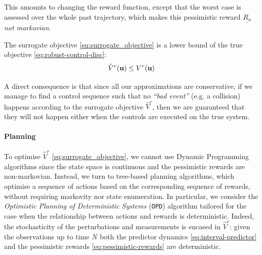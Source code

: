 \documentclass{article}
\begin{document}
This amounts to changing the reward function, except that the worst case is assessed over the whole past trajectory, which makes this pessimistic reward $\underline{R_n}$ \emph{not markovian}.

\begin{proposition}
\label{prop:lower-bound}
The surrogate objective  \eqref{eq:surrogate_objective} is a lower bound of the true objective  \eqref{eq:robust-control-disc}: 
\begin{equation*}
\hat{V}^r(\mathbf{u}) \leq V^r(\mathbf{u})
\end{equation*}
\end{proposition}
A direct consequence is that since all our approximations are conservative, if we manage to find a control sequence such that no \textit{``bad event''} (e.g. a collision) happens according to the surrogate objective $\hat{V}^r$, then we are guaranteed that they will not happen either when the controls are executed on the true system. 

\paragraph{Planning}
To optimise $\hat{V}^r$ \eqref{eq:surrogate_objective}, we cannot use Dynamic Programming algorithms since the state space is continuous and the pessimistic rewards are non-markovian. Instead, we turn to tree-based planning algorithms, which optimise a sequence of actions based on the corresponding sequence of rewards, without requiring markovity nor state enumeration. In particular, we consider the \emph{Optimistic Planning of Deterministic Systems} (\texttt{OPD}) algorithm \citep{Hren2008} tailored for the case when the relationship between actions and rewards is deterministic. Indeed, the stochasticity of the perturbations and measurements is encased in $\hat{V}^r$: given the observations up to time $N$ both the predictor dynamics \eqref{eq:interval-predictor} and the pessimistic rewards \eqref{eq:pessimistic-rewards} are deterministic.
\end{document}
